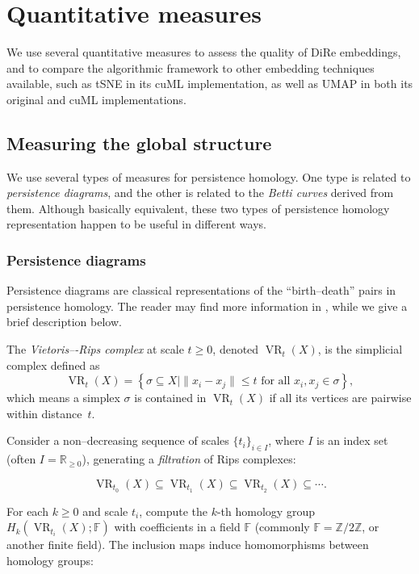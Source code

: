 \documentclass[11pt]{article}
\begin{document}
\section{Quantitative measures}

We use several quantitative measures to assess the quality of DiRe embeddings, and to compare the algorithmic framework to other embedding techniques available, such as tSNE in its cuML implementation, as well as UMAP in both its original and cuML implementations.

\subsection{Measuring the global structure}

We use several types of measures for persistence homology. One type is related to \textit{persistence diagrams}, and the other is related to the \textit{Betti curves} derived from them. Although basically equivalent, these two types of persistence homology representation happen to be useful in different ways. 

\subsubsection{Persistence diagrams}

Persistence diagrams are classical representations of the ``birth--death'' pairs in persistence homology. The reader may find more information in \cite{ZC, zomorodian2005topology}, while we give a brief description below. 

The \textit{Vietoris–-Rips complex} at scale \(t \geq 0\), denoted \(\operatorname{VR}_t(X)\), is the simplicial complex defined as
\[
\operatorname{VR}_t(X) = \left\{ \sigma \subseteq X \mid \|x_i - x_j\| \leq t \text{ for all } x_i, x_j \in \sigma \right\},
\]
which means a simplex \(\sigma\) is contained in \(\operatorname{VR}_t(X)\) if all its vertices are pairwise within distance~\(t\).

Consider a non--decreasing sequence of scales \(\{t_i\}_{i \in I}\), where \(I\) is an index set (often \(I = \mathbb{R}_{\geq 0}\)), generating a \textit{filtration} of Rips complexes:

\[
\operatorname{VR}_{t_0}(X) \subseteq \operatorname{VR}_{t_1}(X) \subseteq \operatorname{VR}_{t_2}(X) \subseteq \cdots.
\]

For each \(k \geq 0\) and scale \(t_i\), compute the \(k\)-th homology group \(H_k\left( \operatorname{VR}_{t_i}(X); \mathbb{F} \right)\) with coefficients in a field \(\mathbb{F}\) (commonly \(\mathbb{F} = \mathbb{Z}/2\mathbb{Z}\), or another finite field). The inclusion maps induce homomorphisms between homology groups:
\end{document}
